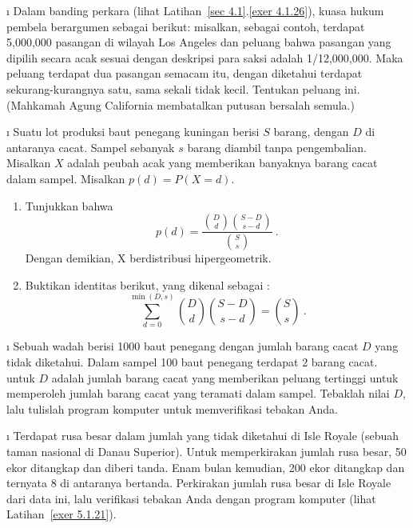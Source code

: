 \begin{LJSItem}
\i\label{exer 9.2.23} Dalam banding perkara  (lihat Latihan~\ref{sec 4.1}.\ref{exer 4.1.26}),
kuasa hukum pembela berargumen sebagai berikut: misalkan, sebagai contoh, terdapat
5{,}000{,}000 pasangan di wilayah Los Angeles dan peluang bahwa pasangan yang dipilih
secara acak sesuai dengan deskripsi para saksi adalah 1/12{,}000{,}000. Maka peluang
terdapat dua pasangan semacam itu, dengan diketahui terdapat sekurang-kurangnya satu,
sama sekali tidak kecil. Tentukan peluang ini. (Mahkamah Agung California membatalkan
putusan bersalah semula.)


\i\label{exer 5.1.20} Suatu lot produksi baut penegang kuningan berisi $S$ barang,
dengan $D$ di antaranya cacat. Sampel sebanyak $s$ barang diambil tanpa pengembalian.
Misalkan $X$ adalah peubah acak yang memberikan banyaknya barang cacat dalam sampel.
Misalkan $p(d) = P(X = d)$.

\begin{enumerate}
\item Tunjukkan bahwa
$$ p(d) = \frac{{D \choose d} {{S - D} \choose {s - d}}}{{S \choose s}}\ .
$$ Dengan demikian, X berdistribusi hipergeometrik.

\item Buktikan identitas berikut, yang dikenal sebagai :
$$
\sum_{d = 0}^{\min(D,s)}{ D \choose d}   {{S - D} \choose {s - d}} =  {S \choose s}\ .
$$
\end{enumerate}

\i\label{exer 5.1.21} Sebuah wadah berisi 1000 baut penegang dengan jumlah barang
cacat $D$ yang tidak diketahui. Dalam sampel 100 baut penegang terdapat 2 barang
cacat. 
untuk $D$ adalah jumlah barang cacat yang memberikan peluang tertinggi untuk memperoleh
jumlah barang cacat yang teramati dalam sampel. Tebaklah nilai $D$, lalu tulislah
program komputer untuk memverifikasi tebakan Anda.

\i\label{exer 5.1.22} Terdapat rusa besar dalam jumlah yang tidak
diketahui di Isle Royale (sebuah taman nasional di Danau Superior).
Untuk memperkirakan jumlah rusa besar, 50 ekor ditangkap dan diberi tanda. Enam bulan
kemudian, 200 ekor ditangkap dan ternyata 8 di antaranya bertanda. Perkirakan jumlah
rusa besar di Isle Royale dari data ini, lalu verifikasi tebakan Anda dengan program
komputer (lihat Latihan~\ref{exer 5.1.21}).


\end{LJSItem}

